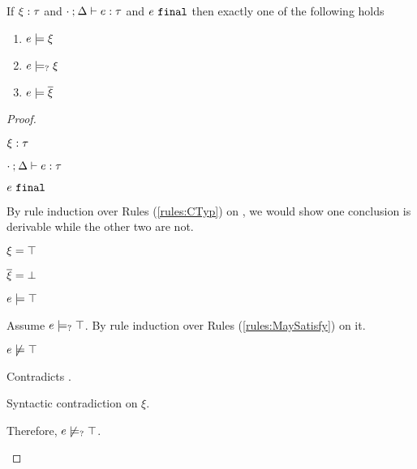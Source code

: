 \begin{theorem}
  \label{thrm:exclusive-constraint-satisfaction}
  If $\xi : \tau$ and $\cdot \mathbin{;} \Delta \vdash e : \tau$ and $e ~\mathtt{final}$ then exactly one of the following holds
  \begin{enumerate}
    \item $e \models \xi$
    \item $e \models_{?} \xi$
    \item $e \models \overline{\xi}$
  \end{enumerate}
\end{theorem}
\begin{proof}
\begin{pfsteps*}
\item $\xi : \tau$  
\item $\cdot \mathbin{;} \Delta \vdash e : \tau$  
\item $e ~\mathtt{final}$  
\end{pfsteps*}
By rule induction over Rules (\ref{rules:CTyp}) on , we would show one conclusion is derivable while the other two are not.
\begin{byCases}

\item[\text{(\ref{rule:CTTruth})}]
    \begin{pfsteps*}
    \item $\xi=\top$ 
    \item $\overline{\xi}=\bot$ 
    \item $e \models \top$  
    \end{pfsteps*}
    Assume $e \models_{?} \top$. By rule induction over Rules (\ref{rules:MaySatisfy}) on it.
    \begin{byCases}
    \item[\text{(\ref{rule:CMSExpEHole}),(\ref{rule:CMSExpHole}),(\ref{rule:CMSAp}),(\ref{rule:CMSMatch}),(\ref{rule:CMSPrl}),(\ref{rule:CMSPrr})}]
        \begin{pfsteps*}
        \item $e \not\models \top$ 
        \end{pfsteps*}
        Contradicts .
    \item
        Syntactic contradiction on $\xi$.
    \end{byCases}
    Therefore, $e \not\models_{?} \top$.
    

\end{byCases}
\end{proof}
